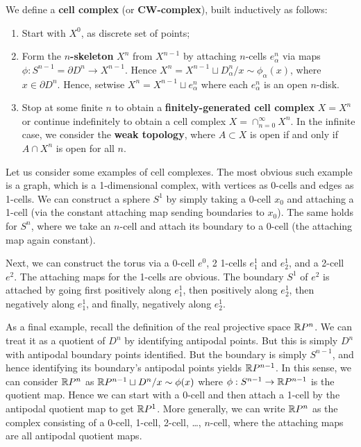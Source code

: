 \documentclass{../mathnotes}
\begin{document}
\begin{defn}
    We define a \textbf{cell complex} (or \textbf{CW-complex}), built inductively as follows:
    \begin{enumerate}
        \item Start with $X^0$, as discrete set of points;
        \item Form the \textbf{$n$-skeleton} $X^{n}$ from $X^{n-1}$ by attaching $n$-cells $e_\alpha^n$
            via maps $\phi:S^{n-1}=\partial D^n\to X^{n-1}$. Hence $X^n=X^{n-1}\sqcup D^n_\alpha/x\sim \phi_\alpha(x)$,
            where $x\in\partial D^n$. Hence, setwise $X^n=X^{n-1}\sqcup e^n_\alpha$ where each $e^n_\alpha$ is an open $n$-disk.
        \item Stop at some finite $n$ to obtain a \textbf{finitely-generated cell complex} $X=X^n$ or continue indefinitely to
            obtain a cell complex $X=\cap_{n=0}^\infty X^n$. In the infinite case, we consider the \textbf{weak topology}, where
            $A\subset X$ is open if and only if $A\cap X^n$ is open for all $n$.
    \end{enumerate}
\end{defn}

\begin{exmp}
    Let us consider some examples of cell complexes. The most obvious such example is a graph, which is a 1-dimensional
    complex, with vertices as 0-cells and edges as 1-cells. We can construct a sphere $S^1$ by simply taking a 0-cell $x_0$ and
    attaching a 1-cell (via the constant attaching map sending boundaries to $x_0$). The same holds for $S^n$, where we take an
    $n$-cell and attach its boundary to a 0-cell (the attaching map again constant).

    Next, we can construct the torus via a 0-cell $e^0$, 2 1-cells $e^1_1$ and $e^1_2$, and a 2-cell $e^2$.
    The attaching maps for the 1-cells are obvious. The boundary $S^1$ of $e^2$ is attached by going first positively
    along $e^1_1$, then positively along $e^1_2$, then negatively along $e^1_1$, and finally, negatively along $e^1_2$.

    As a final example, recall the definition of the real projective space $\mathbb{R} P^n$. We can treat it as a quotient of
    $D^n$ by identifying antipodal points. But this is simply $D^n$ with antipodal boundary points identified. But the boundary
    is simply $S^{n-1}$, and hence identifying its boundary's antipodal points yields $\mathbb{R} P^{n-1}$. In this sense, we can consider
    $\mathbb{R} P^n$ as $\mathbb{R} P^{n-1}\sqcup D^n/x\sim\phi(x)$ where $\phi:S^{n-1}\to\mathbb{R} P^{n-1}$ is the quotient map. Hence we can start with
    a 0-cell and then attach a 1-cell by the antipodal quotient map to get $\mathbb{R} P^1$. More generally, we can write $\mathbb{R} P^n$
    as the complex consisting of a 0-cell, 1-cell, 2-cell, \ldots, $n$-cell, where the attaching maps are all antipodal quotient maps.
\end{exmp}
\end{document}
